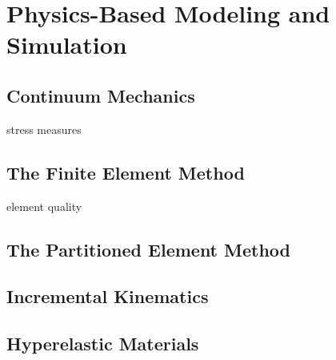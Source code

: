 \chapter{Physics-Based Modeling and Simulation}
\label{chap:4}
%
\section{Continuum Mechanics}
\label{Continuum Mechanics}

stress measures

\section{The Finite Element Method}
\label{The Finite Element Method}

element quality
\section{The Partitioned Element Method}
\label{The Partitioned Element Method}

\section{Incremental Kinematics}
\label{Incremental Kinematics}

\section{Hyperelastic Materials}
\label{Hyperelastic Materials}

